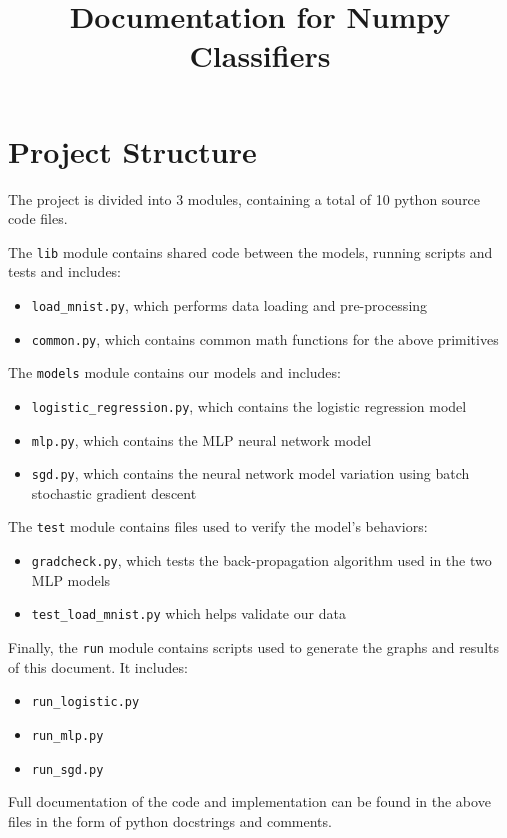 \documentclass{article}
\title{Documentation for Numpy Classifiers}
\newcommand{\code}{\texttt}
\begin{document}
	
\maketitle


\section{Project Structure}
The project is divided into 3 modules, containing a total of 10 python source code files. 

The \code{lib} module contains shared code between the models, running scripts and tests and includes:
\begin{itemize}
	\item \code{load\_mnist.py}, which performs data loading and pre-processing 
	\item \code{common.py}, which contains common math functions for the above primitives
\end{itemize}

The \code{models} module contains our models and includes:
\begin{itemize}
	\item \code{logistic\_regression.py}, which contains the logistic regression model
	\item \code{mlp.py}, which contains the MLP neural network model 
	\item \code{sgd.py}, which contains the neural network model variation using batch stochastic gradient descent
\end{itemize}

The \code{test} module contains files used to verify the model's behaviors:
\begin{itemize}
	\item \code{gradcheck.py}, which tests  the back-propagation algorithm used in the two MLP models
	\item \code{test\_load\_mnist.py} which helps validate our data
\end{itemize}

Finally, the \code{run} module contains scripts used to generate the graphs and results of this document. It includes:
\begin{itemize}
		\item \code{run\_logistic.py}
		\item \code{run\_mlp.py}
		\item \code{run\_sgd.py}
\end{itemize}


Full documentation of the code and implementation can be found in the above files in the form of python docstrings and comments.
\end{document}
